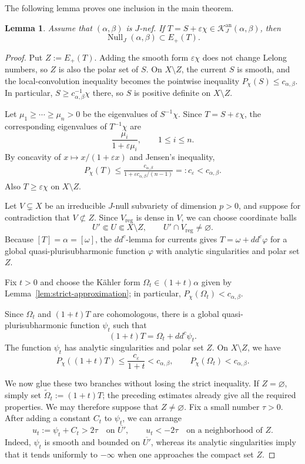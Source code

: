 \documentclass[reqno]{amsart}
\newcommand{\ddc}{dd^c}
\newcommand{\JNull}{\operatorname{Null}_{J}}
\newcommand{\cab}{c_{\alpha,\beta}}
\newcommand{\reg}{\mathrm{reg}}
\newcommand{\cK}{\mathcal K}
\theoremstyle{plain}
\newtheorem{lemma}[thm]{Lemma}
\theoremstyle{remark}
\begin{document}
The following lemma proves one inclusion in the main theorem.
\begin{lemma}\label{lem:easy-direction-inclusion}
Assume that $(\alpha,\beta)$ is $J$-nef. If
$T=S+\varepsilon\chi\in\cK_J^{\mathrm{an}}(\alpha,\beta)$, then
\[
    \JNull(\alpha,\beta)\subset E_+(T).
\]
\end{lemma}
   \begin{proof}
Put $Z:=E_+(T)$.  Adding the smooth form $\varepsilon\chi$ does
not change Lelong numbers, so $Z$ is also the polar set of $S$.
On $X\setminus Z$, the current $S$ is smooth, and the
local-convolution inequality becomes the pointwise inequality
$P_\chi(S)\leq\cab$. In particular,
$S\geq\cab^{-1}\chi$ there, so $S$ is positive definite on
$X\setminus Z$.

Let $\mu_1\geq\cdots\geq\mu_n>0$ be the eigenvalues of
$S^{-1}\chi$. Since $T=S+\varepsilon\chi$, the corresponding
eigenvalues of $T^{-1}\chi$ are
\[
 \frac{\mu_i}{1+\varepsilon\mu_i},
 \qquad 1\leq i\leq n.
\]
By concavity of $x\mapsto x/(1+\varepsilon x)$ and Jensen's inequality,
\begin{align*}
 P_\chi(T)\leq\frac{\cab}{1+\varepsilon\cab/(n-1)}
 =:c_\varepsilon<\cab.
\end{align*}
Also $T\geq\varepsilon\chi$ on $X\setminus Z$.

Let $V\subsetneq X$ be an irreducible $J$-null subvariety of
dimension $p>0$, and suppose for contradiction that $V\not\subset
Z$.  Since $V_{\reg}$ is dense in $V$, we can choose coordinate
balls
\[
 U'\Subset U\Subset X\setminus Z,
 \qquad U'\cap V_{\reg}\ne\varnothing.
\]
Because $[T]=\alpha=[\omega]$, the $\ddc$-lemma for currents gives
$T=\omega+\ddc\varphi$ for a global quasi-plurisubharmonic function
$\varphi$ with analytic singularities and polar set $Z$.

Fix $t>0$ and choose the K\"ahler form
$\Omega_t\in(1+t)\alpha$ given by
Lemma~\ref{lem:strict-approximation}; in particular,
$P_\chi(\Omega_t)<\cab$.

Since $\Omega_t$ and $(1+t)T$ are cohomologous, there is a global
quasi-plurisubharmonic function $\psi_t$ such that
\[
 (1+t)T=\Omega_t+\ddc\psi_t.
\]
The function $\psi_t$ has analytic singularities and polar set $Z$.
On $X\setminus Z$, we have
\[
 P_\chi((1+t) T)\leq\frac{c_\varepsilon}{1+t}<\cab,
 \qquad
 P_\chi(\Omega_t)<\cab.
\]


We now glue these two branches without losing the strict inequality.
If $Z=\varnothing$, simply set $\widetilde\Omega_t:=(1+t) T$;
the preceding estimates already give all the required properties.
We may therefore suppose that $Z\ne\varnothing$.  Fix a small number
$\tau>0$.
After adding a constant $C_t$ to $\psi_t$, we can arrange
\[
 u_t:=\psi_t+C_t>2\tau\quad\text{on }\overline{U'},
 \qquad
 u_t<-2\tau\quad\text{on a neighborhood of }Z.
\]
Indeed, $\psi_t$ is smooth and bounded on $\overline{U'}$, whereas
its analytic singularities imply that it tends uniformly to
$-\infty$ when one approaches the compact set $Z$.


\end{proof}
\end{document}
